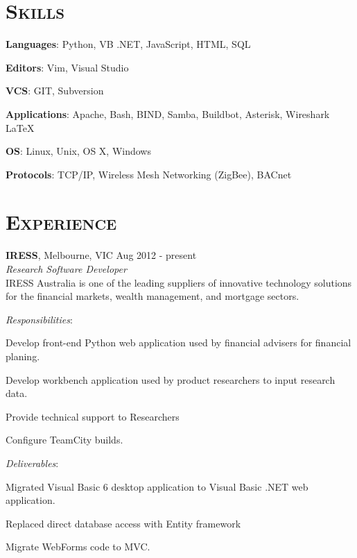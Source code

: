 \documentclass[line,margin]{res}
\begin{document}
    \address{ablack@fastmail.net}
    \address{0401 868 343}

    \begin{resume}
        \section{\textsc{Skills}}
        \begin{list}{}{\leftmargin=1em \itemsep=-2pt}
            \item{\textbf{Languages}: Python, VB .NET, JavaScript, HTML, SQL}
            \item{\textbf{Editors}: Vim, Visual Studio}
            \item{\textbf{VCS}: GIT, Subversion}
            \item{\textbf{Applications}: Apache, Bash, BIND, Samba, Buildbot, Asterisk, Wireshark \LaTeX}
            \item{\textbf{OS}: Linux, Unix, OS X, Windows}
            \item{\textbf{Protocols}: TCP/IP, Wireless Mesh Networking (ZigBee), BACnet}
        \end{list}

        \section{\textsc{Experience}} \textbf{IRESS}, Melbourne, VIC \hfill Aug 2012 - present \\
        \textit{Research Software Developer}\\
        IRESS Australia is one of the leading suppliers of innovative technology solutions for the financial markets, wealth management, and mortgage sectors.

        \textit{Responsibilities}:
        \begin{list}{}{\leftmargin=1em \itemsep=-2pt}
            \item{Develop front-end Python web application used by financial advisers for financial planing.}
            \item{Develop workbench application used by product researchers to input research data.}
            \item{Provide technical support to Researchers}
            \item{Configure TeamCity builds.}
        \end{list}

        \textit{Deliverables}:
        \begin{list}{}{\leftmargin=1em \itemsep=-2pt}
            \item{Migrated Visual Basic 6 desktop application to Visual Basic .NET web application.}
            \item{Replaced direct database access with Entity framework}
            \item{Migrate WebForms code to MVC.}
        \end{list}


\end{resume}
\end{document}
